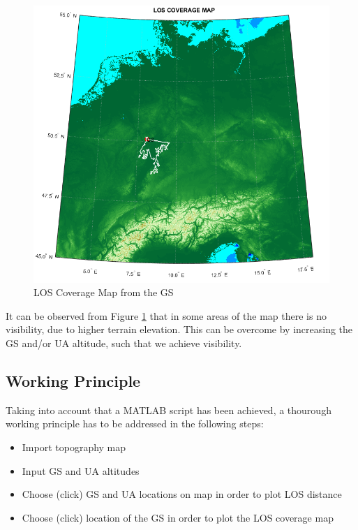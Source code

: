 \begin{figure}[h]
	\centering
	\includegraphics[scale=0.5]{figures/cov_map1.png}
	\caption{LOS Coverage Map from the GS}
   	\label{fig:los_area}
\end{figure}

It can be observed from Figure \ref{fig:los_area} that in some areas of the map there is no visibility, due to higher terrain elevation. This can be overcome by increasing the GS and/or UA altitude, such that we achieve visibility.  

\subsection{Working Principle}
Taking into account that a MATLAB script has been achieved, a thourough working principle has to be addressed in the following steps:
\begin{itemize}
	\item Import topography map 
	\item Input GS and UA altitudes
	\item Choose (click) GS and UA locations on map in order to plot LOS distance
	\item Choose (click) location of the GS in order to plot the LOS coverage map
\end{itemize}